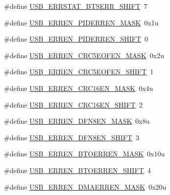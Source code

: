 \begin{DoxyCompactItemize}
\item 
\#define \hyperlink{group___u_s_b___register___masks_ga4827905bfe176b3ba2992ce3ff9a4575}{U\+S\+B\+\_\+\+E\+R\+R\+S\+T\+A\+T\+\_\+\+B\+T\+S\+E\+R\+R\+\_\+\+S\+H\+I\+FT}~7
\item 
\#define \hyperlink{group___u_s_b___register___masks_ga971e0d8939196ec3990a73b4db4030ad}{U\+S\+B\+\_\+\+E\+R\+R\+E\+N\+\_\+\+P\+I\+D\+E\+R\+R\+E\+N\+\_\+\+M\+A\+SK}~0x1u
\item 
\#define \hyperlink{group___u_s_b___register___masks_ga47a2a895b1b94a32aa482d11173e2fb9}{U\+S\+B\+\_\+\+E\+R\+R\+E\+N\+\_\+\+P\+I\+D\+E\+R\+R\+E\+N\+\_\+\+S\+H\+I\+FT}~0
\item 
\#define \hyperlink{group___u_s_b___register___masks_gafab72bb1aedf0d529c720a25d6ee93da}{U\+S\+B\+\_\+\+E\+R\+R\+E\+N\+\_\+\+C\+R\+C5\+E\+O\+F\+E\+N\+\_\+\+M\+A\+SK}~0x2u
\item 
\#define \hyperlink{group___u_s_b___register___masks_gafc8288624f2373be283f408a290f3daf}{U\+S\+B\+\_\+\+E\+R\+R\+E\+N\+\_\+\+C\+R\+C5\+E\+O\+F\+E\+N\+\_\+\+S\+H\+I\+FT}~1
\item 
\#define \hyperlink{group___u_s_b___register___masks_gae216c42729f6b3d992001136744fe341}{U\+S\+B\+\_\+\+E\+R\+R\+E\+N\+\_\+\+C\+R\+C16\+E\+N\+\_\+\+M\+A\+SK}~0x4u
\item 
\#define \hyperlink{group___u_s_b___register___masks_ga7d910c7016807387969de45f0ac3e2d6}{U\+S\+B\+\_\+\+E\+R\+R\+E\+N\+\_\+\+C\+R\+C16\+E\+N\+\_\+\+S\+H\+I\+FT}~2
\item 
\#define \hyperlink{group___u_s_b___register___masks_ga4077d6e25312cdf05ef982907720c2f6}{U\+S\+B\+\_\+\+E\+R\+R\+E\+N\+\_\+\+D\+F\+N8\+E\+N\+\_\+\+M\+A\+SK}~0x8u
\item 
\#define \hyperlink{group___u_s_b___register___masks_ga25ff64c64f5871c1c278c5639d862ba7}{U\+S\+B\+\_\+\+E\+R\+R\+E\+N\+\_\+\+D\+F\+N8\+E\+N\+\_\+\+S\+H\+I\+FT}~3
\item 
\#define \hyperlink{group___u_s_b___register___masks_ga3e02cf7d8b6fce5077848051a320c609}{U\+S\+B\+\_\+\+E\+R\+R\+E\+N\+\_\+\+B\+T\+O\+E\+R\+R\+E\+N\+\_\+\+M\+A\+SK}~0x10u
\item 
\#define \hyperlink{group___u_s_b___register___masks_ga6df540868c71ce6e3c7b8737a048c2aa}{U\+S\+B\+\_\+\+E\+R\+R\+E\+N\+\_\+\+B\+T\+O\+E\+R\+R\+E\+N\+\_\+\+S\+H\+I\+FT}~4
\item 
\#define \hyperlink{group___u_s_b___register___masks_gae1e237556956a0eb5e669aadded213b8}{U\+S\+B\+\_\+\+E\+R\+R\+E\+N\+\_\+\+D\+M\+A\+E\+R\+R\+E\+N\+\_\+\+M\+A\+SK}~0x20u
\item 

\end{DoxyCompactItemize}
